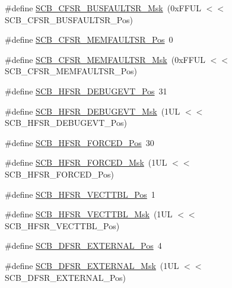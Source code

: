 \begin{DoxyCompactItemize}
\item 
\#define \mbox{\hyperlink{group___c_m_s_i_s___s_c_b_ga26dc1ddfdc37a6b92597a6f7e498c1d6}{S\+C\+B\+\_\+\+C\+F\+S\+R\+\_\+\+B\+U\+S\+F\+A\+U\+L\+T\+S\+R\+\_\+\+Msk}}~(0x\+F\+F\+U\+L $<$$<$ S\+C\+B\+\_\+\+C\+F\+S\+R\+\_\+\+B\+U\+S\+F\+A\+U\+L\+T\+S\+R\+\_\+\+Pos)
\item 
\#define \mbox{\hyperlink{group___c_m_s_i_s___s_c_b_ga91f41491cec5b5acca3fbc94efbd799e}{S\+C\+B\+\_\+\+C\+F\+S\+R\+\_\+\+M\+E\+M\+F\+A\+U\+L\+T\+S\+R\+\_\+\+Pos}}~0
\item 
\#define \mbox{\hyperlink{group___c_m_s_i_s___s_c_b_gad46716159a3808c9e7da22067d6bec98}{S\+C\+B\+\_\+\+C\+F\+S\+R\+\_\+\+M\+E\+M\+F\+A\+U\+L\+T\+S\+R\+\_\+\+Msk}}~(0x\+F\+F\+U\+L $<$$<$ S\+C\+B\+\_\+\+C\+F\+S\+R\+\_\+\+M\+E\+M\+F\+A\+U\+L\+T\+S\+R\+\_\+\+Pos)
\item 
\#define \mbox{\hyperlink{group___c_m_s_i_s___s_c_b_ga300c90cfb7b35c82b4d44ad16c757ffb}{S\+C\+B\+\_\+\+H\+F\+S\+R\+\_\+\+D\+E\+B\+U\+G\+E\+V\+T\+\_\+\+Pos}}~31
\item 
\#define \mbox{\hyperlink{group___c_m_s_i_s___s_c_b_gababd60e94756bb33929d5e6f25d8dba3}{S\+C\+B\+\_\+\+H\+F\+S\+R\+\_\+\+D\+E\+B\+U\+G\+E\+V\+T\+\_\+\+Msk}}~(1\+U\+L $<$$<$ S\+C\+B\+\_\+\+H\+F\+S\+R\+\_\+\+D\+E\+B\+U\+G\+E\+V\+T\+\_\+\+Pos)
\item 
\#define \mbox{\hyperlink{group___c_m_s_i_s___s_c_b_gab361e54183a378474cb419ae2a55d6f4}{S\+C\+B\+\_\+\+H\+F\+S\+R\+\_\+\+F\+O\+R\+C\+E\+D\+\_\+\+Pos}}~30
\item 
\#define \mbox{\hyperlink{group___c_m_s_i_s___s_c_b_ga6560d97ed043bc01152a7247bafa3157}{S\+C\+B\+\_\+\+H\+F\+S\+R\+\_\+\+F\+O\+R\+C\+E\+D\+\_\+\+Msk}}~(1\+U\+L $<$$<$ S\+C\+B\+\_\+\+H\+F\+S\+R\+\_\+\+F\+O\+R\+C\+E\+D\+\_\+\+Pos)
\item 
\#define \mbox{\hyperlink{group___c_m_s_i_s___s_c_b_ga77993da8de35adea7bda6a4475f036ab}{S\+C\+B\+\_\+\+H\+F\+S\+R\+\_\+\+V\+E\+C\+T\+T\+B\+L\+\_\+\+Pos}}~1
\item 
\#define \mbox{\hyperlink{group___c_m_s_i_s___s_c_b_gaac5e289211d0a63fe879a9691cb9e1a9}{S\+C\+B\+\_\+\+H\+F\+S\+R\+\_\+\+V\+E\+C\+T\+T\+B\+L\+\_\+\+Msk}}~(1\+U\+L $<$$<$ S\+C\+B\+\_\+\+H\+F\+S\+R\+\_\+\+V\+E\+C\+T\+T\+B\+L\+\_\+\+Pos)
\item 
\#define \mbox{\hyperlink{group___c_m_s_i_s___s_c_b_ga13f502fb5ac673df9c287488c40b0c1d}{S\+C\+B\+\_\+\+D\+F\+S\+R\+\_\+\+E\+X\+T\+E\+R\+N\+A\+L\+\_\+\+Pos}}~4
\item 
\#define \mbox{\hyperlink{group___c_m_s_i_s___s_c_b_ga3cba2ec1f588ce0b10b191d6b0d23399}{S\+C\+B\+\_\+\+D\+F\+S\+R\+\_\+\+E\+X\+T\+E\+R\+N\+A\+L\+\_\+\+Msk}}~(1\+U\+L $<$$<$ S\+C\+B\+\_\+\+D\+F\+S\+R\+\_\+\+E\+X\+T\+E\+R\+N\+A\+L\+\_\+\+Pos)

\end{DoxyCompactItemize}
